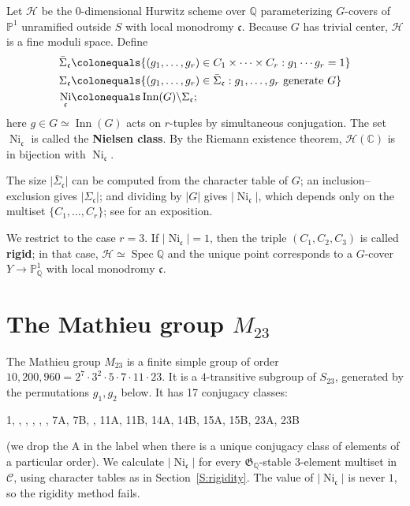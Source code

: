 \documentclass[12pt,reqno]{amsart}
\newcommand{\deficolor}{ForestGreen}
\newcommand{\defi}[1]{\textbf{\color{\deficolor} #1}} %
\newcommand{\C}{\mathbb{C}}
\newcommand{\PP}{\mathbb{P}}
\newcommand{\Q}{\mathbb{Q}}
\newcommand{\calC}{\mathcal{C}}
\newcommand{\calH}{\mathcal{H}}
\newcommand{\cc}{\mathfrak{c}}
\newcommand{\GG}{\mathfrak{G}}
\DeclareMathOperator{\Inn}{Inn}
\DeclareMathOperator{\Ni}{Ni}
\DeclareMathOperator{\Spec}{Spec}
\newcommand{\isom}{\simeq}
\theoremstyle{definition}
\theoremstyle{remark}
\begin{document}
Let $\calH$ be the $0$-dimensional Hurwitz scheme over $\Q$ parameterizing $G$-covers of $\PP^1$ unramified outside $S$ with local monodromy $\cc$.
Because $G$ has trivial center, $\calH$ is a fine moduli space.
Define 
\begin{align*}
   \bar{\Sigma}_\cc &\colonequals \{(g_1,\ldots,g_r) \in C_1 \times \cdots \times C_r : g_1 \cdots g_r = 1 \} \\
   \Sigma_\cc &\colonequals \{(g_1,\ldots,g_r) \in \bar{\Sigma}_\cc : \textup{$g_1,\ldots,g_r$ generate $G$}\} \\
   \Ni_\cc &\colonequals \Inn(G) \backslash \Sigma_\cc;
\end{align*}
here $g \in G \isom \Inn(G)$ acts on $r$-tuples by simultaneous conjugation.
The set $\Ni_\cc$ is called the \defi{Nielsen class}.
By the Riemann existence theorem, $\calH(\C)$ is in bijection with $\Ni_\cc$. 

The size $\lvert \bar{\Sigma}_\cc \rvert$ can be computed from the character table of $G$; an inclusion--exclusion gives $\lvert \Sigma_\cc \rvert$; and dividing by $|G|$ gives $\lvert \Ni_\cc \rvert$, which depends only on the multiset $\{C_1,\ldots,C_r\}$; see \cite[\S7.2 and \S7.3]{Serre1992} for an exposition.

We restrict to the case $r=3$.
If $\lvert \Ni_\cc \rvert = 1$, then the triple $(C_1,C_2,C_3)$ is called \defi{rigid};
in that case, $\calH \isom \Spec \Q$ and the unique point corresponds to a $G$-cover $Y \to \PP^1_\Q$ with local monodromy $\cc$.

\section{The Mathieu group \texorpdfstring{$M_{23}$}{M23}}

The Mathieu group $M_{23}$ is a finite simple group of order $10{,}200{,}960 = 2^7 \cdot 3^2 \cdot 5 \cdot 7 \cdot 11 \cdot 23$.
It is a $4$-transitive subgroup of $S_{23}$, generated by the permutations $g_1,g_2$ below.
It has 17 conjugacy classes:
\begin{center}
  1, , , , , , \; 7A, 7B, , \; 11A, 11B, \; 14A, 14B, \; 15A, 15B, \; 23A, 23B
\end{center}
(we drop the A in the label when there is a unique conjugacy class of elements of a particular order).
We calculate $\lvert \Ni_\cc \rvert$ for every $\GG_\Q$-stable $3$-element multiset in $\calC$,
using character tables as in Section~\ref{S:rigidity}.
The value of $\lvert \Ni_\cc \rvert$ is never $1$, so the rigidity method fails.
\end{document}
